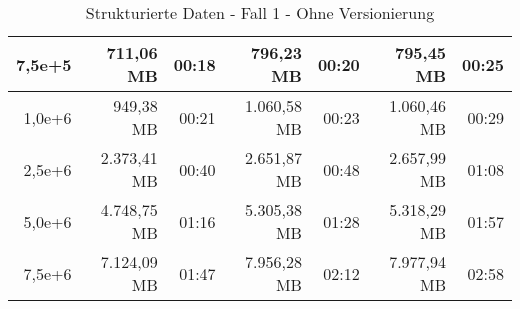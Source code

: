 \begin{table}
\begin{tabular}{|r|r|r|r|r|r|r|}
        7,5e+5 & 711,06 MB     & 00:18 & 796,23 MB     & 00:20 & 795,45 MB     & 00:25 \\ \hline
        1,0e+6 & 949,38 MB     & 00:21 & 1.060,58 MB   & 00:23 & 1.060,46 MB   & 00:29 \\ \hline
        2,5e+6 & 2.373,41 MB   & 00:40 & 2.651,87 MB   & 00:48 & 2.657,99 MB   & 01:08 \\ \hline
        5,0e+6 & 4.748,75 MB   & 01:16 & 5.305,38 MB   & 01:28 & 5.318,29 MB   & 01:57 \\ \hline
        7,5e+6 & 7.124,09 MB   & 01:47 & 7.956,28 MB   & 02:12 & 7.977,94 MB   & 02:58 \\ \hline

    \end{tabular}
    \caption{Strukturierte Daten - Fall 1 - Ohne Versionierung}
\end{table}


